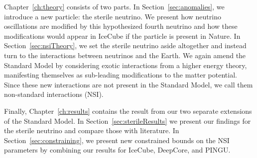 Chapter~\ref{ch:theory} consists of two parts. In Section~\ref{sec:anomalies}, we introduce a new particle: the sterile neutrino. 
We present how neutrino oscillations are modified by this hypothesized fourth neutrino and how these modifications would appear in IceCube if the particle is present in Nature. 
In Section~\ref{sec:nsiTheory}, we set the sterile neutrino aside altogether and instead turn to the interactions between neutrinos and the Earth. 
We again amend the Standard Model by considering exotic interactions from a higher energy theory, manifesting themselves as sub-leading modifications to the matter potential. 
Since these new interactions are not present in the Standard Model, we call them non-standard interactions (NSI). 

Finally, Chapter~\ref{ch:results} contains the result from our two separate extensions of the Standard Model.
In Section~\ref{sec:sterileResults} we present our findings for the sterile neutrino and compare those with literature. 
In Section~\ref{sec:constraining}, we present new constrained bounds on the NSI parameters by combining our results for IceCube, DeepCore, and PINGU.